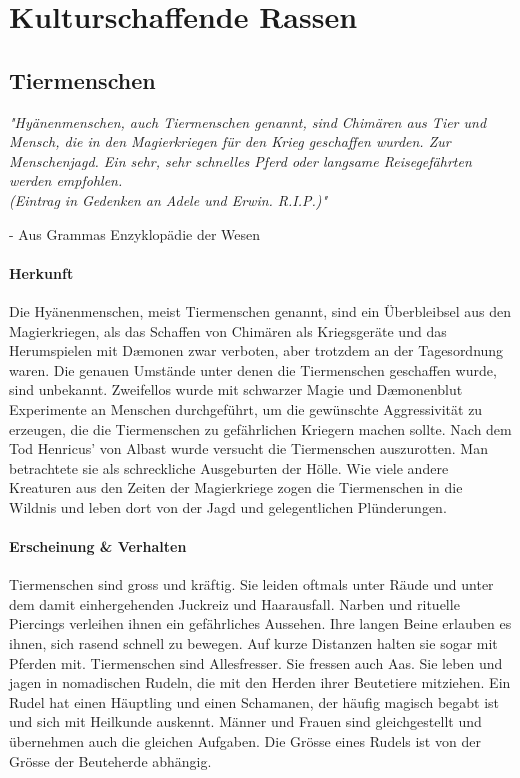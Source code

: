 \documentclass[12pt,twoside,twocolumn,openany]{book}
\begin{document}
\section{Kulturschaffende Rassen}
\subsection{Tiermenschen}
\begin{quotebox}
	\textit{"Hyänenmenschen, auch Tiermenschen genannt, sind Chimären aus Tier und Mensch, die in den Magierkriegen für den Krieg geschaffen wurden. Zur Menschenjagd. Ein sehr, sehr schnelles Pferd oder langsame Reisegefährten werden empfohlen. \\ (Eintrag in Gedenken an Adele und Erwin. R.I.P.)"}
	\begin{flushright}
		- Aus Grammas Enzyklopädie der Wesen
	\end{flushright}
\end{quotebox}

\paragraph{Herkunft}
Die Hyänenmenschen, meist Tiermenschen genannt, sind ein Überbleibsel aus den Magierkriegen, als das Schaffen von Chimären als Kriegsgeräte und das Herumspielen mit D\ae monen zwar verboten, aber trotzdem an der Tagesordnung waren.
Die genauen Umstände unter denen die Tiermenschen geschaffen wurde, sind unbekannt. Zweifellos wurde mit schwarzer Magie und D\ae monenblut Experimente an  Menschen durchgeführt, um die gewünschte Aggressivität zu erzeugen, die die Tiermenschen zu gefährlichen Kriegern machen sollte.
Nach dem Tod Henricus' von Albast wurde versucht die Tiermenschen auszurotten. Man betrachtete sie als schreckliche Ausgeburten der Hölle. Wie  viele andere Kreaturen aus den Zeiten der Magierkriege zogen die Tiermenschen in die Wildnis und leben dort von der Jagd und gelegentlichen Plünderungen.

\paragraph{Erscheinung \& Verhalten}
Tiermenschen sind gross und kräftig. Sie leiden oftmals unter Räude und unter dem damit einhergehenden Juckreiz und Haarausfall. Narben und rituelle Piercings verleihen ihnen ein gefährliches Aussehen. Ihre langen Beine erlauben es ihnen, sich rasend schnell zu bewegen. Auf kurze Distanzen  halten sie sogar mit Pferden mit.
Tiermenschen sind Allesfresser. Sie fressen auch Aas. Sie leben und jagen in nomadischen Rudeln, die mit den Herden ihrer Beutetiere mitziehen.
Ein Rudel hat einen Häuptling und einen Schamanen, der häufig magisch begabt ist und sich mit Heilkunde auskennt. Männer und Frauen sind gleichgestellt und übernehmen auch die gleichen Aufgaben. Die Grösse eines Rudels ist von der Grösse der Beuteherde abhängig.
\end{document}
